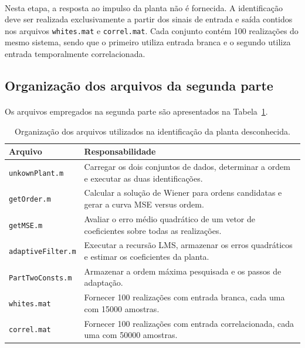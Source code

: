 \documentclass[11pt,a4paper,oneside]{report}
\renewcommand{\arraystretch}{1.18}
\begin{document}
\paragraph{} Nesta etapa, a resposta ao impulso da planta não é fornecida. A identificação deve ser realizada
exclusivamente a partir dos sinais de entrada e saída contidos nos arquivos \texttt{whites.mat} e
\texttt{correl.mat}. Cada conjunto contém 100 realizações do mesmo sistema, sendo que o primeiro
utiliza entrada branca e o segundo utiliza entrada temporalmente correlacionada.

\subsection{Organização dos arquivos da segunda parte}

\paragraph{} Os arquivos empregados na segunda parte são apresentados na Tabela~\ref{tab:arquivos-parte2}.

\begin{table}[H]
    \centering
    \caption{Organização dos arquivos utilizados na identificação da planta desconhecida.}
    \label{tab:arquivos-parte2}
    \small
    \setlength{\tabcolsep}{6pt}
    \renewcommand{\arraystretch}{1.25}
    \begin{tabular}{
        @{}
        >{\raggedright\arraybackslash}p{}
        >{\raggedright\arraybackslash}p{}
        @{}
    }
        \toprule
        \textbf{Arquivo} & \textbf{Responsabilidade} \\
        \midrule
        \texttt{unkownPlant.m} & Carregar os dois conjuntos de dados, determinar a ordem e executar as duas identificações. \\
        \texttt{getOrder.m} & Calcular a solução de Wiener para ordens candidatas e gerar a curva MSE versus ordem. \\
        \texttt{getMSE.m} & Avaliar o erro médio quadrático de um vetor de coeficientes sobre todas as realizações. \\
        \texttt{adaptiveFilter.m} & Executar a recursão LMS, armazenar os erros quadráticos e estimar os coeficientes da planta. \\
        \texttt{PartTwoConsts.m} & Armazenar a ordem máxima pesquisada e os passos de adaptação. \\
        \texttt{whites.mat} & Fornecer 100 realizações com entrada branca, cada uma com 15000 amostras. \\
        \texttt{correl.mat} & Fornecer 100 realizações com entrada correlacionada, cada uma com 50000 amostras. \\
        \bottomrule
    \end{tabular}
\end{table}
\end{document}

